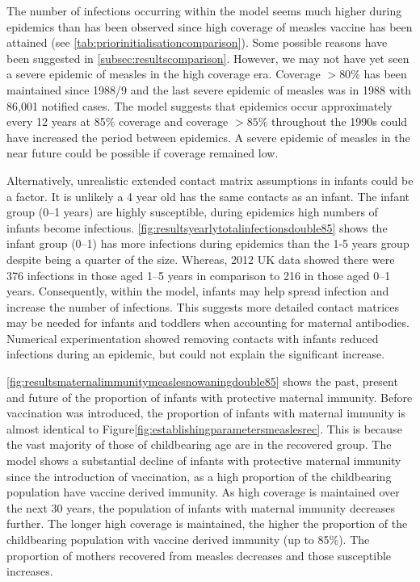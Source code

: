 \documentclass[a4paper,11pt] {scrartcl}
\begin{document}
The number of infections occurring within the model seems much higher during epidemics than has been observed since high coverage of measles vaccine has been attained (see \autoref{tab:priorinitialisationcomparison}). Some possible reasons have been suggested in \autoref{subsec:resultscomparison}. However, we may not have yet seen a severe epidemic of measles in the high coverage era. Coverage $>80\%$ has been maintained since 1988/9 and the last severe epidemic of measles was in 1988 with 86,001 notified cases. The model suggests that epidemics occur approximately every 12 years at 85\% coverage and coverage $>85\%$ throughout the 1990s could have increased the period between epidemics. A severe epidemic of measles in the near future could be possible if coverage remained low.

Alternatively, unrealistic extended contact matrix assumptions in infants could be a factor. It is unlikely a 4 year old has the same contacts as an infant. The infant group (0--1 years) are highly susceptible, during epidemics high numbers of infants become infectious. \autoref{fig:resultsyearlytotalinfectionsdouble85} shows the infant group (0--1) has more infections during epidemics than the 1-5 years group despite being a quarter of the size. Whereas, 2012 UK data\cite{hpameasles2012cases} showed there were 376 infections in those aged 1--5 years in comparison to 216 in those aged 0--1 years. Consequently, within the model, infants may help spread infection and increase the number of infections. This suggests more detailed contact matrices may be needed for infants and toddlers when accounting for maternal antibodies. Numerical experimentation showed removing contacts with infants reduced infections during an epidemic, but could not explain the significant increase.

\autoref{fig:resultsmaternalimmunitymeaslesnowaningdouble85} shows the past, present and future of the proportion of infants with protective maternal immunity. Before vaccination was introduced, the proportion of infants with maternal immunity is almost identical to Figure\autoref{fig:establishingparametersmeaslesrec}. This is because the vast majority of those of childbearing age are in the recovered group. The model shows a substantial decline of infants with protective maternal immunity since the introduction of vaccination, as a high proportion of the childbearing population have vaccine derived immunity. As high coverage is maintained over the next 30 years, the population of infants with maternal immunity decreases further. The longer high coverage is maintained, the higher the proportion of the childbearing population with vaccine derived immunity (up to 85\%). The proportion of mothers recovered from measles decreases and those susceptible increases.
\end{document}
